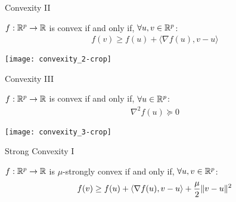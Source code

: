 \begin{frame}{Convexity II}
    \begin{proposition}
        $f: \mathbb{R}^p \rightarrow \mathbb{R}$ is convex if and only if, $ \forall u, v \in \mathbb{R}^p$:
        \begin{align*}
            f(v)
            \geq 
            f(u) 
            + \langle \nabla f(u), v - u \rangle 
    \end{align*}
    \end{proposition}

    \centering
    \texttt{[image: convexity\_2-crop]}
    
\end{frame}

\begin{frame}{Convexity III}
    \begin{proposition}
        $f: \mathbb{R}^p \rightarrow \mathbb{R}$ is convex if and only if, $ \forall u\in \mathbb{R}^p$:
        \begin{align*}
            \nabla^2 f(u) \succeq 0
        \end{align*}
    \end{proposition}
    
    \centering
    \texttt{[image: convexity\_3-crop]}
\end{frame}



\begin{frame}{Strong Convexity I}
    \begin{definition}
    $f: \mathbb{R}^p \rightarrow \mathbb{R}$ is $\mu$-strongly convex if and only if, $ \forall u, v \in \mathbb{R}^p$:
        \begin{align*}
            f(v)
            \geq 
            f(u) 
            + \langle \nabla f(u), v - u \rangle 
            + \frac{\mu}{2} \lVert {v - u} \rVert^2
    \end{align*}
    \end{definition}
\end{frame}

